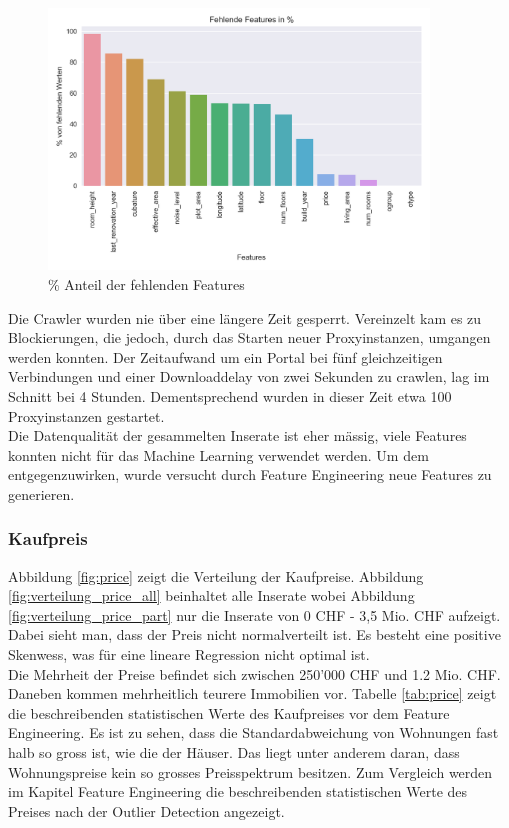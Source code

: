 \begin{figure}[h!]
\centering
\includegraphics[width=0.9\textwidth]{images/missing_values.png}
\caption[\% Anteil der fehlenden Features]{\% Anteil der fehlenden Features}%
\label{fig:features}
\end{figure}

Die Crawler wurden nie über eine längere Zeit gesperrt. Vereinzelt kam es zu Blockierungen, die jedoch, durch das Starten neuer Proxyinstanzen, umgangen werden konnten. Der Zeitaufwand um ein Portal bei fünf gleichzeitigen Verbindungen und einer Downloaddelay von zwei Sekunden zu crawlen, lag im Schnitt bei 4 Stunden. Dementsprechend wurden in dieser Zeit etwa 100 Proxyinstanzen gestartet.\\[2ex]
%
Die Datenqualität der gesammelten Inserate ist eher mässig, viele Features konnten nicht für das Machine Learning verwendet werden. Um dem entgegenzuwirken, wurde versucht durch Feature Engineering neue Features zu generieren.

\subsubsection{Kaufpreis}
Abbildung \ref{fig:price} zeigt die Verteilung der Kaufpreise. Abbildung \ref{fig:verteilung_price_all} beinhaltet alle Inserate wobei Abbildung \ref{fig:verteilung_price_part} nur die Inserate von 0 CHF - 3,5 Mio. CHF aufzeigt. Dabei sieht man, dass der Preis nicht normalverteilt ist. Es besteht eine positive Skenwess, was für eine lineare Regression nicht optimal ist.\\
Die Mehrheit der Preise befindet sich zwischen 250'000 CHF und 1.2 Mio. CHF. Daneben kommen mehrheitlich teurere Immobilien vor. Tabelle \ref{tab:price} zeigt die beschreibenden statistischen Werte des Kaufpreises vor dem Feature Engineering. Es ist zu sehen, dass die Standardabweichung von Wohnungen fast halb so gross ist, wie die der Häuser. Das liegt unter anderem daran, dass Wohnungspreise kein so grosses Preisspektrum besitzen. Zum Vergleich werden im Kapitel Feature Engineering die beschreibenden statistischen Werte des Preises nach der Outlier Detection angezeigt.

